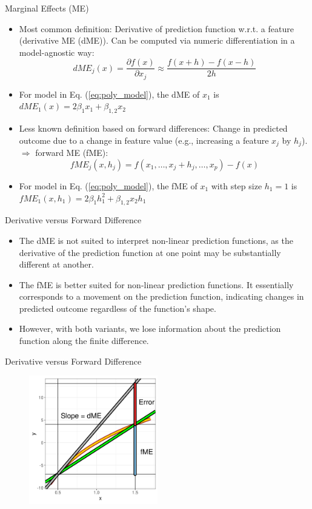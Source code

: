 \documentclass[11pt,compress,t,notes=noshow, aspectratio=169, xcolor=table]{beamer}
\begin{document}
\begin{frame}{Marginal Effects (ME)}

\begin{itemize}
\item
Most common definition: Derivative of prediction function w.r.t. a feature (derivative ME (dME)). Can be computed via numeric differentiation in a model-agnostic way:
$$dME_j(x) = \frac{\partial f(x)}{\partial x_j} \approx \frac{f(x + h) - f(x - h)}{2h}$$
\item For model in Eq. (\ref{eq:poly_model}), the dME of $x_1$ is $dME_1(x) = 2\beta_1 x_1 +  \beta_{1, 2} x_2$
\item Less known definition based on forward differences: Change in predicted outcome due to a change in feature value (e.g., increasing a feature $x_j$ by $h_j$). $\Rightarrow$ forward ME (fME):
\begin{equation*}
fME_j(x, h_j) = f(x_1, \dots, x_j + h_j, \dots, x_p) - f(x)
\end{equation*}
\item For model in Eq. (\ref{eq:poly_model}), the fME of $x_1$ with step size $h_1 = 1$ is
$fME_1(x, h_1) = 2\beta_1 h_1^2 +  \beta_{1, 2} x_2 h_1$
\end{itemize}
\end{frame}

\begin{frame}{Derivative versus Forward Difference}

\begin{itemize}
\itemsep2em
\item The dME is not suited to interpret non-linear prediction functions, as the derivative of the prediction function at one point may be substantially different at another.
\item The fME is better suited for non-linear prediction functions. It essentially corresponds to a movement on the prediction function, indicating changes in predicted outcome regardless of the function's shape.
\item However, with both variants, we lose information about the prediction function along the finite difference.
\end{itemize}
\end{frame}

\begin{frame}{Derivative versus Forward Difference}
\begin{figure}
  \includegraphics[width = 0.5\textwidth]{figure_man/derivative_me_error.png}
\end{figure}
\end{frame}
\end{document}
